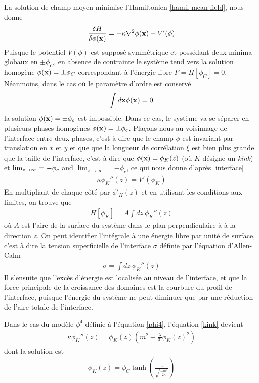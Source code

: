 La solution de champ moyen minimise l'Hamiltonien \ref{hamil-mean-field},  nous donne
\begin{align}
    \frac{\delta H}{\delta \phi({\bf x})} = -\kappa \nabla^2 \phi({\bf x}) + V'(\phi)
    \label{interface}
\end{align}
Puisque le potentiel $V(\phi)$ est supposé symmétrique et possédant deux minima globaux en $\pm \phi_C$, en absence de contrainte le système tend vers la solution homogène $\phi({\bf x}) = \pm \phi_C$ correspondant à l'énergie libre $F=H[\phi_C]=0$. Néanmoins, dans le cas où le paramètre d'ordre est conservé
\begin{align}
    \int d {\bf x} \phi({\bf x})=0
\end{align}
la solution $\phi({\bf x})=\pm \phi_c$ est impossible. Dans ce cas, le système va se séparer en plusieurs phases homogènes $\phi({\bf x})= \pm \phi_c$. Plaçons-nous au voisinnage de l'interface entre deux phases, c'est-à-dire que le champ $\phi$ est invariant par translation en $x$ et $y$ et que que la longueur de corrélation $\xi$ est bien plus grande que la taille de l'interface, c'est-à-dire que $\phi({\bf x}) = \phi_K(z)$ (où $K$ désigne un \textit{kink}) et $\lim_{z\to\-\infty}=-\phi_c$ and  $\lim_{z\to\infty}=-\phi_c$, ce qui nous donne d'après \ref{interface}
\begin{align}
    \kappa \phi_K''(z) =  V'(\phi_K)
    \label{kink}
\end{align}
En multipliant de chaque côté par $\phi'_K(z)$ et en utilisant les conditions aux limites, on trouve que 
\begin{align}
    H[\phi_K]=  A\int dz\  \phi_K''(z)
\end{align}
où $A$ est l'aire de la surface du système dans le plan perpendiculaire à à la direction $z$. On peut identifier l'intégrale à une énergie libre par unité de surface, c'est à dire la tension superficielle de l'interface $\sigma$ définie par l'équation d'Allen-Cahn
\begin{align}
    \sigma=  \int dz\  \phi_K''(z)
    \label{tension-superficielle}
\end{align}
Il s'ensuite que l'excès d'énergie est localisée au niveau de l'interface, et que la force principale de la croissance des domaines est la courbure du profil de l'interface, puisque l'énergie du système ne peut diminuer que par une réduction de l'aire totale de l'interface. 

Dans le cas du modèle $\phi^4$ définie à l'équation \ref{phi4}, l'équation \ref{kink} devient
\begin{align}
    \kappa \phi_K''(z) = \phi_K(z) \left( m^2 + \frac{\lambda}{3!} \phi_K(z) ^2 \right)
       \label{eq-interface-glauber}
\end{align}
dont la solution est
\begin{align}
    \phi_K(z) = \phi_C \tanh \left( \frac{z}{\sqrt{\frac{-m^2}{2 \kappa}}} \right)
       \label{profil-interface-glauber}    
\end{align}


